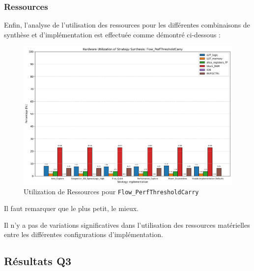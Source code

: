 \documentclass[../CSC_5RO07_TA.tex]{subfiles}
\begin{document}
\subsubsection{Ressources}
\noindent Enfin, l'analyse de l'utilisation des ressources pour les différentes combinaisons de synthèse et d'implémentation est effectuée comme démontré ci-dessous :
\begin{figure}[H]
	\centering
	\includegraphics[width=0.5\linewidth]{images/2_utilization_Flow_PerfThresholdCarry.png}
	\caption{Utilization de Ressources pour \texttt{Flow\_PerfThresholdCarry}}
	\label{fig:ressouces_2}
\end{figure}
\begin{remark}
    Il faut remarquer que le plus petit, le mieux.
\end{remark}
\noindent Il n'y a pas de variations significatives dans l'utilisation des ressources matérielles entre les différentes configurations d'implémentation.



\subsection{Résultats Q3}
\end{document}
